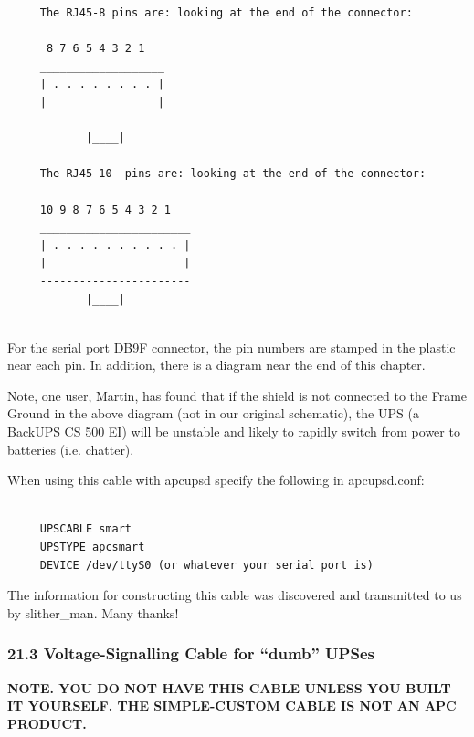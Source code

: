 {{{{{{{{{{\begin{verbatim}
     The RJ45-8 pins are: looking at the end of the connector:
     
      8 7 6 5 4 3 2 1
     ___________________
     | . . . . . . . . |
     |                 |
     -------------------
            |____|
     
     The RJ45-10  pins are: looking at the end of the connector:
     
     10 9 8 7 6 5 4 3 2 1
     _______________________
     | . . . . . . . . . . |
     |                     |
     -----------------------
            |____|
     
\end{verbatim}
\normalsize

For the serial port DB9F connector, the pin numbers are stamped in the plastic
near each pin. In addition, there is a diagram near the end of this chapter.  

Note, one user, Martin, has found that if the shield is not connected to the
Frame Ground in the above diagram (not in our original schematic), the UPS (a
BackUPS CS 500 EI) will be unstable and likely to rapidly switch from power to
batteries (i.e. chatter).  

When using this cable with apcupsd specify the following in apcupsd.conf: 

\footnotesize
\begin{verbatim}
     
     UPSCABLE smart
     UPSTYPE apcsmart
     DEVICE /dev/ttyS0 (or whatever your serial port is)
\end{verbatim}
\normalsize

The information for constructing this cable was discovered and transmitted to
us by slither\_man. Many thanks! 

\label{Voltage_002dSignalling-Cable-for-_0022dumb_0022-UPSes}

\subsubsection*{21.3 Voltage-Signalling Cable for ``dumb'' UPSes}

\label{index-Cables_002c-dumb-196}
\label{index-dumb_002c-Cables-197}
{\bf NOTE. YOU DO NOT HAVE THIS CABLE UNLESS YOU BUILT IT YOURSELF.  THE
SIMPLE-CUSTOM CABLE IS NOT AN APC PRODUCT.}  

}}}}}}}}}}
